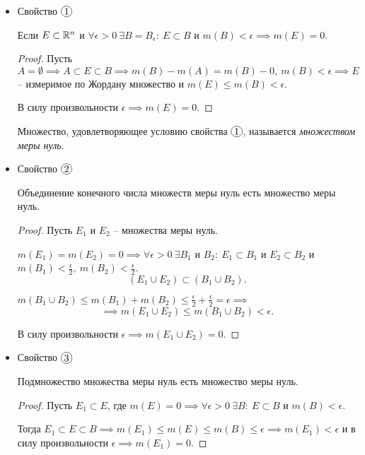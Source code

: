 \begin{itemize}
    \item Свойство $ \circled{1} $
          \begin{statement}
              Если $ E \subset \mathbb{R}^n $ и $ \forall \epsilon > 0 \ \exists B = B_\epsilon: \ E \subset B $ и $ m(B) < \epsilon \implies m(E) = 0 $.
          \end{statement}
          \begin{proof}
              Пусть $ A = \emptyset \implies A \subset E \subset B \implies m(B) - m(A) = m(B) - 0, \ m(B) < \epsilon \implies E $ -- измеримое по Жордану множество и $ m(E) \leqslant m(B) < \epsilon $.

              В силу произвольности $ \epsilon \implies m(E) = 0 $.
          \end{proof}

          \begin{definition}
              Множество, удовлетворяющее условию свойства $ \circled{1} $, называется \emph{множеством меры нуль}.
          \end{definition}

    \item Свойство $ \circled{2} $
          \begin{statement}
              Объединение конечного числа множеств меры нуль есть множество меры нуль.
          \end{statement}
          \begin{proof}
              Пусть $ E_1 $ и $ E_2 $ -- множества меры нуль.

              $ m(E_1) = m(E_2) = 0 \implies \forall \epsilon > 0 \ \exists B_1 $ и $ B_2: \ E_1 \subset B_1 $ и $ E_2 \subset B_2 $ и $ m(B_1) < \frac{\epsilon}{2}, \ m(B_2) < \frac{\epsilon}{2} $.
              \[
                  (E_1 \cup E_2) \subset (B_1 \cup B_2).
              \]

              $ m(B_1 \cup B_2) \leqslant m(B_1) + m(B_2) \leqslant \frac{\epsilon}{2} + \frac{\epsilon}{2} = \epsilon \implies $
              \[
                  \implies m(E_1 \cup E_2) \leqslant m(B_1 \cup B_2) < \epsilon.
              \]

              В силу произвольности $ \epsilon \implies m(E_1 \cup E_2) = 0 $.
          \end{proof}

    \item Свойство $ \circled{3} $
          \begin{statement}
              Подмножество множества меры нуль есть множество меры нуль.
          \end{statement}
          \begin{proof}
              Пусть $ E_1 \subset E $, где $ m(E) = 0 \implies \forall \epsilon > 0 \ \exists B: \ E \subset B $ и $ m(B) < \epsilon $.

              Тогда $ E_1 \subset E \subset B \implies m(E_1) \leqslant m(E) \leqslant m(B) \leqslant \epsilon \implies m(E_1) < \epsilon $ и в силу произвольности $ \epsilon \implies m(E_1) = 0 $.
          \end{proof}
\end{itemize}

